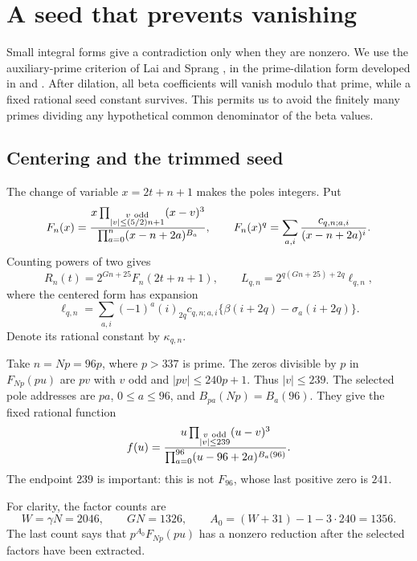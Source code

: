 \documentclass[11pt]{article}
\theoremstyle{remark}
\numberwithin{equation}{section}
\begin{document}
\section{A seed that prevents vanishing}\label{sec:seed}

Small integral forms give a contradiction only when they are
nonzero. We use the auxiliary-prime criterion of Lai and Sprang
\cite[Lemma~2.3]{laisprang}, in the prime-dilation form developed in
\cite[Section~4]{powered} and \cite[Section~5]{fifteen}.
After dilation, all beta coefficients will vanish modulo that prime,
while a fixed rational seed constant survives. This permits us
to avoid the finitely many primes dividing any hypothetical common
denominator of the beta values.

\subsection{Centering and the trimmed seed}

The change of variable $x=2t+n+1$ makes the poles integers.
Put
\[
 F_n(x)=
 \frac{x\prod_{\substack{v\ {\rm odd}\\|v|\le(5/2)n+1}}(x-v)^3}
      {\prod_{a=0}^n(x-n+2a)^{B_a}},
 \qquad
 F_n(x)^q=\sum_{a,i}\frac{c_{q,n;a,i}}{(x-n+2a)^i}.
\]
Counting powers of two gives
\begin{equation}\label{eq:center}
 R_n(t)=2^{Gn+25}F_n(2t+n+1),\qquad
 L_{q,n}=2^{q(Gn+25)+2q}\ell_{q,n},
\end{equation}
where the centered form has expansion
\begin{equation}\label{eq:centerform}
 \ell_{q,n}=\sum_{a,i}(-1)^a(i)_{2q}c_{q,n;a,i}
                         \{\beta(i+2q)-\sigma_a(i+2q)\}.
\end{equation}
Denote its rational constant by $\kappa_{q,n}$.

Take $n=Np=96p$, where $p>337$ is prime. The zeros divisible by
$p$ in $F_{Np}(pu)$ are $pv$ with $v$ odd and
$|pv|\le240p+1$. Thus $|v|\le239$.
The selected pole addresses are $pa$, $0\le a\le96$, and
$B_{pa}(Np)=B_a(96)$. They give the fixed rational function
\begin{equation}\label{eq:seedfunction}
 f(u)=
 \frac{u\prod_{\substack{v\ {\rm odd}\\|v|\le239}}(u-v)^3}
      {\prod_{a=0}^{96}(u-96+2a)^{B_a(96)}}.
\end{equation}
The endpoint $239$ is important: this is not $F_{96}$, whose
last positive zero is $241$.

For clarity, the factor counts are
\[
 W=\gamma N=2046,\qquad GN=1326,\qquad
 A_0=(W+31)-1-3\cdot240=1356.
\]
The last count says that $p^{A_0}F_{Np}(pu)$ has a nonzero
reduction after the selected factors have been extracted.
\end{document}
